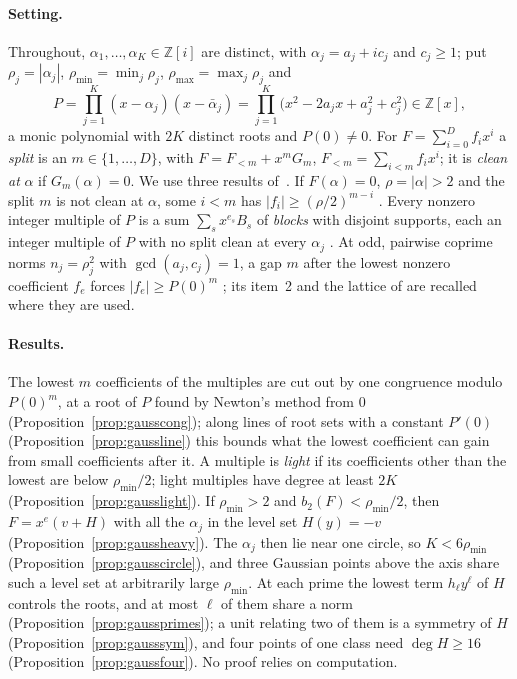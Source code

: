\documentclass[11pt]{article}
\begin{document}
\paragraph{Setting.}  Throughout, $\alpha_1,\ldots,\alpha_K\in\mathbb Z[i]$
are distinct, with $\alpha_j=a_j+ic_j$ and $c_j\ge1$; put
$\rho_j=|\alpha_j|$, $\rho_{\min}=\min_j\rho_j$,
$\rho_{\max}=\max_j\rho_j$ and
\[
  P=\prod_{j=1}^K(x-\alpha_j)(x-\bar\alpha_j)
   =\prod_{j=1}^K\bigl(x^2-2a_jx+a_j^2+c_j^2\bigr)\in\mathbb Z[x],
\]
a monic polynomial with $2K$ distinct roots and $P(0)\ne0$.  For
$F=\sum_{i=0}^Df_ix^i$ a \emph{split} is an $m\in\{1,\ldots,D\}$, with
$F=F_{<m}+x^mG_m$, $F_{<m}=\sum_{i<m}f_ix^i$; it is \emph{clean at} $\alpha$
if $G_m(\alpha)=0$.  We use three results of~\cite{coefficient-mass-sectors}.
If $F(\alpha)=0$, $\rho=|\alpha|>2$ and the split $m$ is not clean at
$\alpha$, some $i<m$ has $|f_i|\ge(\rho/2)^{m-i}$
\cite[Lemma~3.1]{coefficient-mass-sectors}.  Every nonzero integer multiple
of $P$ is a sum $\sum_sx^{e_s}B_s$ of \emph{blocks} with disjoint supports,
each an integer multiple of $P$ with no split clean at every $\alpha_j$
\cite[Lemma~3.2]{coefficient-mass-sectors}.  At odd, pairwise coprime norms
$n_j=\rho_j^2$ with $\gcd(a_j,c_j)=1$, a gap $m$ after the lowest nonzero
coefficient $f_e$ forces $|f_e|\ge P(0)^m$
\cite[Proposition~5.3]{coefficient-mass-sectors}; its item~2 and the
lattice of \cite[Proposition~5.4]{coefficient-mass-sectors} are recalled
where they are used.

\paragraph{Results.}  The lowest $m$ coefficients of the multiples are cut
out by one congruence modulo $P(0)^m$, at a root of $P$ found by Newton's
method from $0$ (Proposition~\ref{prop:gausscong}); along lines of root sets
with a constant $P'(0)$ (Proposition~\ref{prop:gaussline}) this bounds what
the lowest coefficient can gain from small coefficients after it.  A
multiple is \emph{light} if its coefficients other than the lowest are below
$\rho_{\min}/2$; light multiples have degree at least $2K$
(Proposition~\ref{prop:gausslight}).  If $\rho_{\min}>2$ and
$b_2(F)<\rho_{\min}/2$, then $F=x^e(v+H)$ with all the $\alpha_j$ in the
level set $H(y)=-v$ (Proposition~\ref{prop:gaussheavy}).  The $\alpha_j$ then
lie near one circle, so $K<6\rho_{\min}$
(Proposition~\ref{prop:gausscircle}), and three Gaussian points above the
axis share such a level set at arbitrarily large $\rho_{\min}$.  At each
prime the lowest term $h_\ell y^\ell$ of $H$ controls the roots, and at most
$\ell$ of them share a norm (Proposition~\ref{prop:gaussprimes}); a unit
relating two of them is a symmetry of $H$ (Proposition~\ref{prop:gausssym}),
and four points of one class need $\deg H\ge16$
(Proposition~\ref{prop:gaussfour}).  No proof relies on computation.
\end{document}
